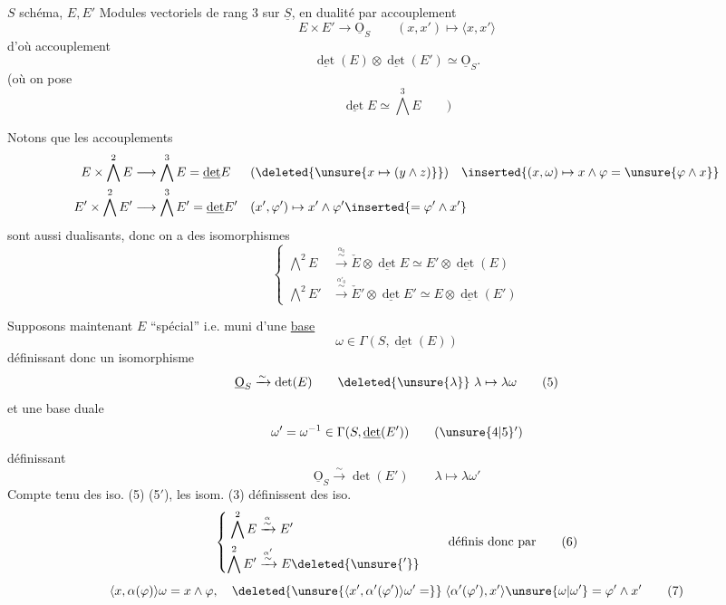 
$S$ schéma, $E,E'$ Modules vectoriels de rang 3 sur $\underline S$, en dualité par accouplement
\[
 E\times E'\longrightarrow\underline{\mathrm O}_S\qquad (x,x')\longmapsto\langle x,x'\rangle \tag*{(1)}
\]
d'où accouplement
\[
 \underline{\det}(E)\otimes\underline{\det}(E')\simeq\underline{\mathrm O}_S. \tag*{(2)}
\]
(où on pose
\[
 \underline{\det} E\simeq\bigwedge^3 E\qquad )
\]

Notons que les accouplements
\[
\begin{aligned}
 E\times\bigwedge^2 E&\longrightarrow\bigwedge^3 E=\underline{\det} E
 &&(\deleted{\unsure{x\mapsto(y\wedge z)}})\quad
 \inserted{(x,\omega)\mapsto x\wedge\varphi=\unsure{\varphi\wedge x}}\\
 E'\times\bigwedge^2 E'&\longrightarrow\bigwedge^3 E'=\underline{\det} E'
 &&(x',\varphi')\mapsto x'\wedge\varphi'\inserted{=\varphi'\wedge x'}
\end{aligned}
\]
sont aussi dualisants, donc on a des isomorphismes
\[
\left\{\begin{aligned}
 \bigwedge^2 E&\xrightarrow{\overset{\alpha_0}{\sim}}\check E\otimes\underline{\det} E\simeq E'\otimes\underline{\det}(E)\\
 \bigwedge^2 E'&\xrightarrow{\overset{\alpha'_0}{\sim}}\check E'\otimes\underline{\det} E'\simeq E\otimes\underline{\det}(E')
\end{aligned}\right. \tag*{(3)}
\]

Supposons maintenant $E$ ``spécial'' i.e. muni d'une \uline{base}
\[
 \omega\in\Gamma(S,\underline{\det}(E)) \tag*{(4)}
\]
définissant donc un isomorphisme
\[
 \underline{\mathrm O}_S\xrightarrow{\sim}\det(E)\qquad
 \deleted{\unsure{\lambda}}\ \lambda\mapsto\lambda\omega \tag*{(5)}
\]
et une base duale
\[
 \omega'=\omega^{-1}\in\Gamma(S,\underline{\det}(E')) \tag*{(\unsure{4|5}$'$)}
\]
définissant
\[
 \underline{\mathrm O}_S\xrightarrow{\sim}\det(E')\qquad\lambda\mapsto\lambda\omega' \tag*{(5$'$)}
\]
Compte tenu des iso. (5) (5$'$), les isom. (3) définissent des iso.
\[
\left\{\begin{aligned}
 \bigwedge^2 E&\xrightarrow{\overset{\alpha}{\sim}}E'\\
 \bigwedge^2 E'&\xrightarrow{\overset{\alpha'}{\sim}}E\deleted{\unsure{'}}
\end{aligned}\right.\qquad\text{définis donc par} \tag*{(6)}
\]
\[
 \langle x,\alpha(\varphi)\rangle\omega=x\wedge\varphi,\quad
 \deleted{\unsure{\langle x',\alpha'(\varphi')\rangle\omega'=}}\;
 \langle\alpha'(\varphi'),x'\rangle\unsure{\omega|\omega'}=\varphi'\wedge x' \tag*{(7)}
\]

